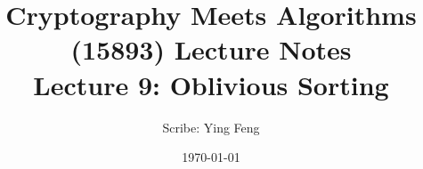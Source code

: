 \documentclass[11pt]{article}
\title{{\Large Cryptography Meets Algorithms (15893) Lecture Notes}\\[5pt]
{\bf Lecture 9: Oblivious Sorting}}
\author{Scribe: Ying Feng}
\date{\today}
\theoremstyle{definition}
\begin{document}
\maketitle


{

}
%



\end{document}
